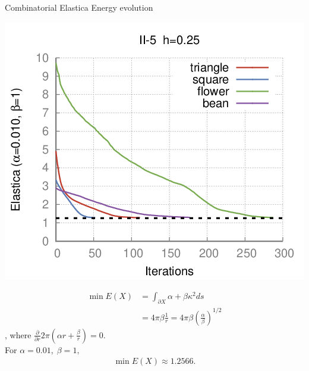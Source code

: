 \begin{frame}
	{Combinatorial Elastica}	
	{Energy evolution}

\begin{minipage}{0.49\textwidth}
\center
\includegraphics[scale=0.3]{figures/combinatorial-elastica/flow/ii/elastica/len_pen_0.01000/jonctions_1/curve_segs_4/best/gs_0.25000/summary-ii5.png}
\end{minipage}
\begin{minipage}{0.49\textwidth}
\begin{align*}
	\min E(X) &= \int_{\partial X}{ \alpha + \beta \kappa^2 ds}\\
	 &= 4\pi \beta \frac{1}{r} = 4\pi \beta \left(\frac{\alpha}{\beta}\right)^{1/2}
\end{align*}
, where $\frac{\partial }{\partial r} 2\pi(\alpha r + \frac{\beta}{r}) = 0.$\\ 

%
For $\alpha=0.01,\; \beta=1,$
%
\begin{align*}
	\min E(X) \approx 1.2566.
\end{align*}
\end{minipage}

\vspace{1em}

	
\end{frame}

